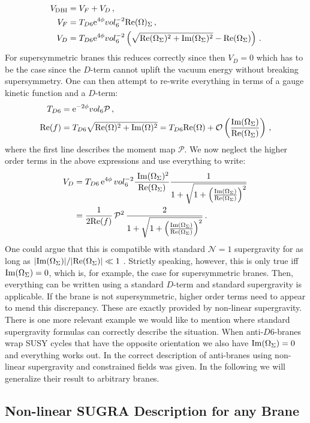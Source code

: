 \documentclass[a4paper,12pt,twoside,openright]{report}
\newcommand{\bea}{\begin{equation}\begin{aligned}}
\newcommand{\eea}{\end{aligned}\end{equation}}
\def\rme{{\rm e}}
\def\rmre{{\rm Re}}
\def\rmim{{\rm Im}}
\begin{document}
\bea
V_{\text{DBI}} &= V_F + V_D\,,\\
V_F &= T_{D6} \rme^{4 \phi} vol_6^{-2} \rmre (\Omega)_\Sigma\,,\\
V_D &= T_{D6} \rme^{4 \phi} vol_6^{-2} \left( \sqrt{\rmre(\Omega_\Sigma)^2 + \rmim(\Omega_\Sigma)^2} - \rmre (\Omega_\Sigma)\right)\,.
\eea
For supersymmetric branes this reduces correctly since then $V_D = 0$ which has to be the case since the $D$-term cannot uplift the vacuum energy without breaking supersymmetry. One can then attempt to re-write everything in terms of a gauge kinetic function and a $D$-term:
\bea 
T_{D6} &= \rme^{-2\phi}vol_6 \mathcal{P}\,,\\
\rmre(f) &= T_{D6} \sqrt{\rmre(\Omega)^2+\rmim(\Omega)^2} = T_{D6} \rmre(\Omega) + \mathcal{O} \left(\frac{\rmim(\Omega_\Sigma)}{\rmre(\Omega_\Sigma)}\right)\,,
\eea
where the first line describes the moment map $\mathcal{P}$. We now neglect the higher order terms in the above expressions and use everything to write:
\bea 
V_D &= T_{D6} \, \rme^{4 \phi} \, vol_6^{-2} \frac{\;\rmim(\Omega_\Sigma)^2}{\rmre(\Omega_\Sigma)} \frac{1}{1+\sqrt{1+\left(\frac{\rmim(\Omega_\Sigma)}{\rmre(\Omega_\Sigma)}\right)^2}}\,\\
&= \frac{1}{2\rmre(f)} \, \mathcal{P}^2 \, \frac{2}{1+\sqrt{1+\left(\frac{\rmim(\Omega_\Sigma)}{\rmre(\Omega_\Sigma)}\right)^2}}\,.
\eea
One could argue that this is compatible with standard $\mathcal{N}=1$ supergravity for as long as $|\rmim(\Omega_\Sigma)|/|\rmre(\Omega_\Sigma)| \ll 1$ \cite{Villadoro:2006ia}. Strictly speaking, however, this is only true iff $\rmim(\Omega_\Sigma) = 0$, which is, for example, the case for supersymmetric branes. Then, everything can be written using a standard $D$-term and standard supergravity is applicable. If the brane is not supersymmetric, higher order terms need to appear to mend this discrepancy. These are exactly provided by non-linear supergravity. There is one more relevant example we would like to mention where standard supergravity formulas can correctly describe the situation. When anti-$D6$-branes wrap SUSY cycles that have the opposite orientation we also have $\rmim(\Omega_\Sigma)=0$ and everything works out. In \cite{Kallosh:2018nrk} the correct description of anti-branes using non-linear supergravity and constrained fields was given. In the following we will generalize their result to arbitrary branes.

\subsection{Non-linear SUGRA Description for any Brane}
\end{document}
